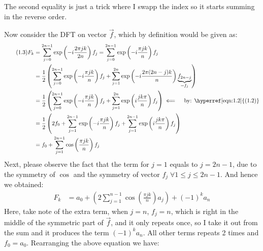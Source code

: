 \documentclass[]{article}
\begin{document}
    The second equality is just a trick where I swapp the index so it starts summing in the reverse order. 
    \par
    Now consider the DFT on vector $\vec{f}$, which by definition would be given as: 
    \begin{align*}\tag{1.3}\label{eqn:1.3}
        F_k &= \sum_{j = 0}^{2n - 1}
            \exp\left(
                - i \frac{2\pi j k}{2n}
            \right)f_j
        = \sum_{j = 0}^{2n - 1}
        \exp\left(
            - i \frac{\pi j k}{n}
        \right)f_j
        \\
        &= 
        \frac{1}{2}
        \left(
            \sum_{j = 0}^{2n - 1}
            \exp
            \left(
                -i\frac{\pi j k}{n}
            \right)f_j
            + 
            \sum_{j = 1}^{2n}
            \exp\left(
                -i \frac{2\pi (2n - j)k}{n}
            \right)\underbrace{f_{2n -j}}_{= f_j}
        \right)
        \\
        &= 
        \frac{1}{2}
        \left(
            \sum_{j = 0}^{2n - 1}
            \exp
            \left(
                -i\frac{\pi j k}{n}
            \right)f_j
            + 
            \sum_{j = 1}^{2n}
            \exp\left(
                i\frac{jk\pi}{n}
            \right)f_j
        \right) \impliedby \quad \text{by: \hyperref[eqn:1.2]{(1.2)}}
        \\
        &= \frac{1}{2}
        \left(
            2f_0 + 
            \sum_{j = 1}^{2n - 1}
            \exp
            \left(
                -i\frac{\pi j k}{n}
            \right)f_j
            + 
            \sum_{j = 1}^{2n - 1}
            \exp\left(
                i\frac{jk\pi}{n}
            \right)f_j
        \right)
        \\
        &= f_0 + \sum_{j = 1}^{2n - 1}
        \cos\left(
            \frac{\pi j k}{n}
        \right)f_j
    \end{align*}
    Next, please observe the fact that the term for $j = 1$ equals to $j = 2n - 1$, due to the symmetry of $\cos$ and the symmetry of vector $f_j\; \forall 1 \le j \le 2n - 1$. And hence we obtained: 
    \begin{align*}\tag{1.4}\label{eqn:1.4}
        F_k &= a_0 + \left(
            2 \sum_{j = 1}^{n - 1}
            \cos\left(
                \frac{\pi j k}{n}
            \right)a_j
        \right) + (-1)^k a_n
    \end{align*}    
    Here, take note of the extra term, when $j = n$, $f_j = n$, which is right in the middle of the symmetric part of $\vec{f}$, and it only repeats once, so I take it out from the sum and it produces the term $(- 1)^ka_n$. All other terms repeats 2 times and $f_0 = a_0$. Rearranging the above equation we have: 
\end{document}
